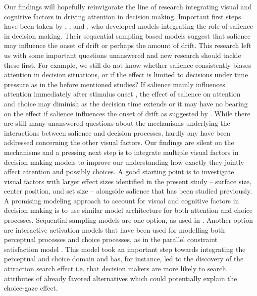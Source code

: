 Our findings will hopefully reinvigorate the line of research integrating visual and cognitive factors in driving attention in decision making. Important first steps have been taken by \cite{chen2013}, \cite{navalpakkam2010}, and \cite{towal2013a}, who developed models integrating the role of salience in decision making. Their sequential sampling based models suggest that salience may influence the onset of drift or perhaps the amount of drift. This research left us with some important questions unanswered and new research should tackle these first. For example, we still do not know whether salience consistently biases attention in decision situations, or if the effect is limited to decisions under time pressure as in the before mentioned studies? If salience mainly influences attention immediately after stimulus onset \citep{theeuwes2010, orquin2015a}, the effect of salience on attention and choice may diminish as the decision time extends or it may have no bearing on the effect if salience influences the onset of drift as suggested by \cite{chen2013}. While there are still many unanswered questions about the mechanisms underlying the interactions between salience and decision processes, hardly any have been addressed concerning the other visual factors. Our findings are silent on the mechanisms and a pressing next step is to integrate multiple visual factors in decision making models to improve our understanding how exactly they jointly affect attention and possibly choices. A good starting point is to investigate visual factors with larger effect sizes identified in the present study -- surface size, center position, and set size -- alongside salience that has been studied previously. A promising modeling approach to account for visual and cognitive factors in decision making is to use similar model architecture for both attention and choice processes. Sequential sampling models are one option, as used in \cite{towal2013a}. Another option are interactive activation models that have been used for modelling both perceptual processes \citep{mcclelland1981} and choice processes, as in the parallel constraint satisfaction model \citep{gloeckner2011a}. This model took an important step towards integrating the perceptual and choice domain and has, for instance, led to the discovery of the attraction search effect i.e. that decision makers are more likely to search attributes of already favored alternatives \citep{jekel2018} which could potentially explain the choice-gaze effect. \\   

